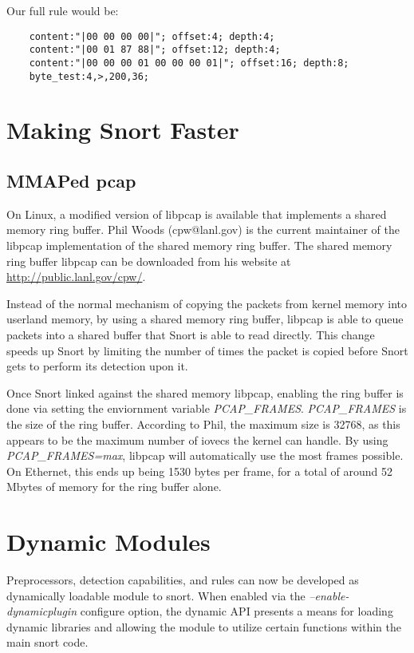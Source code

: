 \documentclass[english]{report}
\begin{document}
Our full rule would be:    

\begin{verbatim}
    content:"|00 00 00 00|"; offset:4; depth:4;
    content:"|00 01 87 88|"; offset:12; depth:4;
    content:"|00 00 00 01 00 00 00 01|"; offset:16; depth:8;
    byte_test:4,>,200,36;
\end{verbatim}

\newpage
\chapter{Making Snort Faster}

\section{MMAPed pcap}

On Linux, a modified version of libpcap is available that implements a shared memory ring buffer.  Phil Woods (cpw@lanl.gov) is the current maintainer of the libpcap implementation of the shared memory ring buffer.  The shared memory ring buffer libpcap can be downloaded from his website at \url{http://public.lanl.gov/cpw/}.

Instead of the normal mechanism of copying the packets from kernel memory into userland memory, by using a shared memory ring buffer, libpcap is able to queue packets into a shared buffer that Snort is able to read directly.  This change speeds up Snort by limiting the number of times the packet is copied before Snort gets to perform its detection upon it.

Once Snort linked against the shared memory libpcap, enabling the ring buffer is done via setting the enviornment variable \emph{PCAP\_FRAMES}.  \emph{PCAP\_FRAMES} is the size of the ring buffer.  According to Phil, the maximum size is 32768, as this appears to be the maximum number of iovecs the kernel can handle.  By using \emph{PCAP\_FRAMES=max}, libpcap will automatically use the most frames possible.  On Ethernet, this ends up being 1530 bytes per frame, for a total of around 52 Mbytes of memory for the ring buffer alone.

\newpage
\chapter{Dynamic Modules}\label{Dynamic Modules}

Preprocessors, detection capabilities, and rules can now be developed as 
dynamically loadable module to snort.  When enabled via the
{\em --enable-dynamicplugin} configure option, the dynamic
API presents a means for loading dynamic libraries and allowing the 
module to utilize certain functions within the main snort code.
\end{document}
